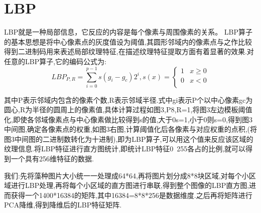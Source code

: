 \documentclass[12pt]{article}
\numberwithin{equation}{section}%
\begin{document}
\section{LBP}

LBP就是一种局部信息，它反应的内容是每个像素与周围像素的关系。
LBP算子的基本思想是将中心像素点的灰度值设为阈值,其圆形邻域内的像素点与之作比较得到二进制码用来表述局部纹理特征,在描述纹理特征提取方面有着显著的效果.对任意的LBP算子,它的编码公式为:
\begin{equation}
LBP_{P,R}=\sum_{i=0}^{p-1}s(g_{i}-g_{c})2^{i}, s(x)= \left\{ \begin{array}{ll}
1 & \textrm{$x\geq0$}\\
0 & \textrm{$x<0$}\\
\end{array} \right.
\end{equation}

其中P表示邻域内包含的像素个数,R表示邻域半径.式中gi表示P个以中心像素gc为圆心,R为半径的圆周上的像素值,具体计算过程如图3,P8,R=1,将图3左边模板阈值化,即使各邻域像素点与中心像素做比较得到s的值,大于0s=1,小于0则s=0,得到图3中间图,确定各像素点的权重,如图3右图,计算阈值化后各像素与对应权重的点积,(将图3中间图的二进制数转化为十进制),即为LBP算子,可以用这个值来反应该区域的纹理信息.将LBP特征进行直方图统计,即统计LBP特征0~255各占的比例,就可以得到一个具有256维特征的数据.

我们:先将藻种图片大小统一一处理成64*64,再将图片划分成8*8块区域,对每个小区域进行LBP处理,再将每个小区域的直方图进行串联,得到整个图像的LBP直方图,进而获得一个1400*16384的矩阵,其中16384=8*8*256是数据维度.之后再将矩阵进行PCA降维,得到降维后的LBP特征矩阵.


\end{document}
